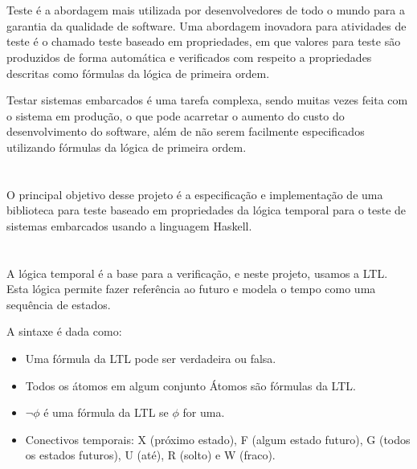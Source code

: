 \documentclass{sciposter}
\newcommand{\tituloA}[1]{\Large{\emph{\textbf{\color{white}{#1}}}}}
\begin{document}
  \begin{multicols}{3}{

  \setlength{\parindent}{2em}

  \section*{\tituloA{Introdução}}
    \Large Teste é a abordagem mais utilizada por desenvolvedores de todo o mundo para a garantia da qualidade de software. Uma abordagem inovadora para atividades de teste é o chamado teste baseado em propriedades, em que valores para teste são produzidos de forma automática e verificados com respeito a propriedades descritas como fórmulas da lógica de primeira ordem. 
    \par Testar sistemas embarcados é uma tarefa complexa, sendo muitas vezes feita com o sistema em produção, o que pode acarretar o aumento do custo do desenvolvimento do software, além de não serem facilmente especificados utilizando fórmulas da lógica de primeira ordem. 
    
\section*{\tituloA{Objetivos}}
O principal objetivo desse projeto é a especificação e implementação de uma biblioteca para teste baseado em propriedades da lógica temporal para o teste de sistemas embarcados usando a linguagem Haskell.

\section*{\tituloA{Sintaxe da Lógica Temporal}}

A lógica temporal é a base para a verificação, e neste projeto, usamos a LTL. Esta lógica permite fazer referência ao futuro e modela o tempo como uma sequência de estados.
\par A sintaxe é dada como:
\begin{itemize}
	 \item Uma fórmula da LTL pode ser verdadeira ou falsa.
	 \item Todos os átomos em algum conjunto Átomos são fórmulas da LTL.
	 \item $\neg \phi$ é uma fórmula da LTL se $\phi$ for uma.
	 \item Conectivos temporais: X (próximo estado), F (algum estado futuro), G (todos os estados futuros), U (até), R (solto) e W (fraco).
\end{itemize}

}
\end{multicols}
\end{document}
